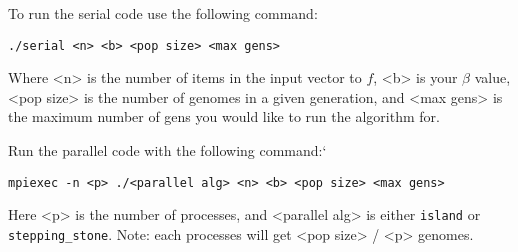\documentclass[11pt]{article}
\begin{document}
To run the serial code use the following command:
\begin{verbatim}
./serial <n> <b> <pop size> <max gens>
\end{verbatim}

Where <n> is the number of items in the input vector to \(f\), <b> is your \(\beta\) value, <pop size> is the number of genomes in a given generation, and <max gens> is the maximum number of gens you would like to run the algorithm for.

Run the parallel code with the following command:`
\begin{verbatim}
mpiexec -n <p> ./<parallel alg> <n> <b> <pop size> <max gens>
\end{verbatim}

Here <p> is the number of processes, and <parallel alg> is either \texttt{island} or \texttt{stepping\_stone}. Note: each processes will get <pop size> / <p> genomes.
\end{document}

